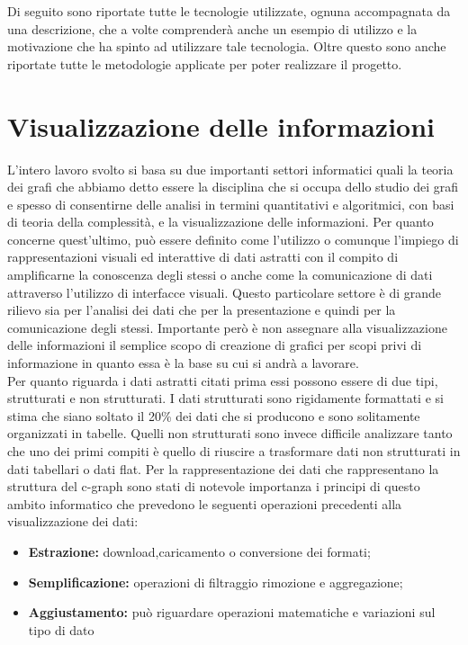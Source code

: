 \large{
Di seguito sono riportate tutte le tecnologie utilizzate, ognuna accompagnata da una descrizione, che a volte comprenderà anche un esempio di utilizzo e la motivazione che ha spinto ad utilizzare tale tecnologia. Oltre questo sono anche riportate tutte le metodologie applicate per poter realizzare il progetto.

\section{Visualizzazione delle informazioni}
L'intero lavoro svolto si basa su due importanti settori informatici quali la teoria dei grafi che abbiamo detto essere la disciplina che si occupa dello studio dei grafi e spesso di consentirne delle analisi in termini quantitativi e algoritmici, con basi di teoria della complessità, e la visualizzazione delle informazioni. Per quanto concerne quest'ultimo, può essere definito come l'utilizzo o comunque l'impiego di rappresentazioni visuali ed interattive di dati astratti con il compito di amplificarne la conoscenza degli stessi o anche come la comunicazione di dati attraverso l'utilizzo di interfacce visuali. Questo particolare settore è di grande rilievo sia per l'analisi dei dati che per la presentazione e quindi per la comunicazione degli stessi. Importante però è non assegnare alla visualizzazione delle informazioni il semplice scopo di creazione di grafici per scopi privi di informazione in quanto essa è la base su cui si andrà a lavorare. \\
Per quanto riguarda i dati astratti citati prima essi possono essere di due tipi, strutturati e non strutturati. I dati strutturati sono rigidamente formattati e si stima che siano soltato il 20\% dei dati che si producono e sono solitamente organizzati in tabelle. Quelli non strutturati sono invece difficile analizzare tanto che uno dei primi compiti è quello di riuscire a trasformare dati non strutturati in dati tabellari o dati flat.
Per la rappresentazione dei dati che rappresentano la struttura del c-graph sono stati di notevole importanza i principi di questo ambito informatico che prevedono le seguenti operazioni precedenti alla visualizzazione dei dati:
\begin{itemize}
	\item\textbf{Estrazione:} download,caricamento o conversione dei formati;
	\item\textbf{Semplificazione:} operazioni di filtraggio rimozione e aggregazione;
	\item\textbf{Aggiustamento: } può riguardare operazioni matematiche e variazioni sul tipo di dato
\end{itemize}

}
